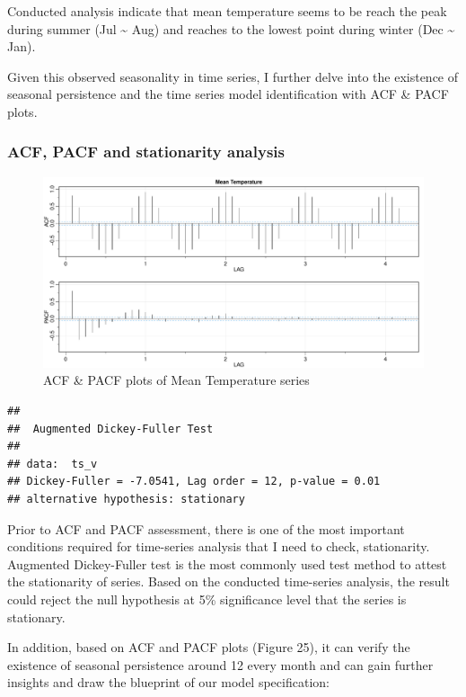 \documentclass[
  11pt,
]{article}
\begin{document}
Conducted analysis indicate that mean temperature seems to be reach the
peak during summer (Jul \textasciitilde{} Aug) and reaches to the lowest
point during winter (Dec \textasciitilde{} Jan).

Given this observed seasonality in time series, I further delve into the
existence of seasonal persistence and the time series model
identification with ACF \& PACF plots.

\newpage

\hypertarget{acf-pacf-and-stationarity-analysis-2}{%
\subsubsection{ACF, PACF and stationarity
analysis}\label{acf-pacf-and-stationarity-analysis-2}}

\begin{figure}
\centering
\includegraphics{ST422_files/figure-latex/unnamed-chunk-33-1.pdf}
\caption{ACF \& PACF plots of Mean Temperature series}
\end{figure}

\begin{verbatim}
## 
##  Augmented Dickey-Fuller Test
## 
## data:  ts_v
## Dickey-Fuller = -7.0541, Lag order = 12, p-value = 0.01
## alternative hypothesis: stationary
\end{verbatim}

Prior to ACF and PACF assessment, there is one of the most important
conditions required for time-series analysis that I need to check,
stationarity. Augmented Dickey-Fuller test is the most commonly used
test method to attest the stationarity of series. Based on the conducted
time-series analysis, the result could reject the null hypothesis at 5\%
significance level that the series is stationary.

In addition, based on ACF and PACF plots (Figure 25), it can verify the
existence of seasonal persistence around 12 every month and can gain
further insights and draw the blueprint of our model specification:
\end{document}
